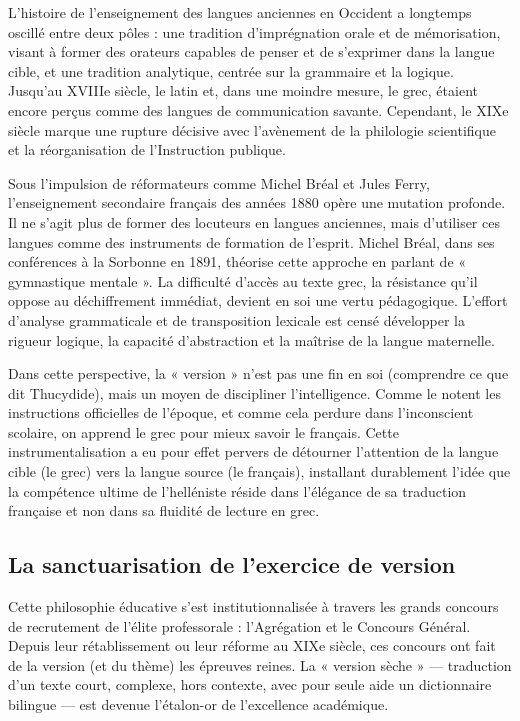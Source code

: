 L'histoire de l'enseignement des langues anciennes en Occident a longtemps oscillé entre deux pôles
: une tradition d'imprégnation orale et de mémorisation, visant à former des orateurs capables de
penser et de s'exprimer dans la langue cible, et une tradition analytique, centrée sur la grammaire
et la logique.\cite{II-3-1-ref10} Jusqu'au XVIIIe siècle, le latin et, dans une moindre mesure, le
grec, étaient encore perçus comme des langues de communication savante. Cependant, le XIXe siècle
marque une rupture décisive avec l'avènement de la philologie scientifique et la réorganisation de
l'Instruction publique.

Sous l'impulsion de réformateurs comme Michel Bréal et Jules Ferry, l'enseignement secondaire
français des années 1880 opère une mutation profonde.\cite{II-3-1-ref11} Il ne s'agit plus de former
des locuteurs en langues anciennes, mais d'utiliser ces langues comme des instruments de formation
de l'esprit. Michel Bréal, dans ses conférences à la Sorbonne en 1891, théorise cette approche en
parlant de « gymnastique mentale ».\cite{II-3-1-ref13} La difficulté d'accès au texte grec, la
résistance qu'il oppose au déchiffrement immédiat, devient en soi une vertu pédagogique. L'effort
d'analyse grammaticale et de transposition lexicale est censé développer la rigueur logique, la
capacité d'abstraction et la maîtrise de la langue maternelle.\cite{II-3-1-ref10}

Dans cette perspective, la « version » n'est pas une fin en soi (comprendre ce que dit Thucydide),
mais un moyen de discipliner l'intelligence. Comme le notent les instructions officielles de
l'époque, et comme cela perdure dans l'inconscient scolaire, on apprend le grec pour mieux savoir le
français.\cite{II-3-1-ref16} Cette instrumentalisation a eu pour effet pervers de détourner
l'attention de la langue cible (le grec) vers la langue source (le français), installant durablement
l'idée que la compétence ultime de l'helléniste réside dans l'élégance de sa traduction française et
non dans sa fluidité de lecture en grec.



\subsection{La sanctuarisation de l'exercice de version}

Cette philosophie éducative s'est institutionnalisée à travers les grands concours de recrutement de
l'élite professorale : l'Agrégation et le Concours Général. Depuis leur rétablissement ou leur
réforme au XIXe siècle, ces concours ont fait de la version (et du thème) les épreuves
reines.\cite{II-3-1-ref17} La « version sèche » — traduction d'un texte court, complexe, hors
contexte, avec pour seule aide un dictionnaire bilingue — est devenue l'étalon-or de l'excellence
académique.\cite{II-3-1-ref2}

